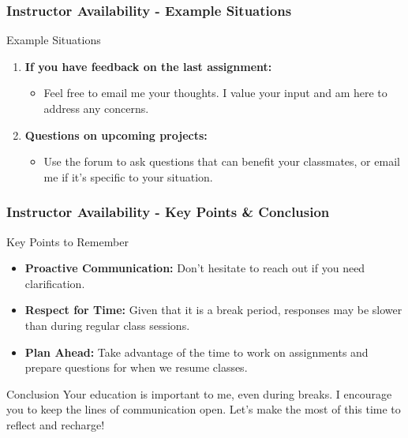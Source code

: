 \documentclass[aspectratio=169]{beamer}
\begin{document}
\begin{frame}[fragile]
    \frametitle{Instructor Availability - Example Situations}
    \begin{block}{Example Situations}
        \begin{enumerate}
            \item \textbf{If you have feedback on the last assignment:}
                \begin{itemize}
                    \item Feel free to email me your thoughts. I value your input and am here to address any concerns.
                \end{itemize}
            \item \textbf{Questions on upcoming projects:}
                \begin{itemize}
                    \item Use the forum to ask questions that can benefit your classmates, or email me if it’s specific to your situation.
                \end{itemize}
        \end{enumerate}
    \end{block}
\end{frame}

\begin{frame}[fragile]
    \frametitle{Instructor Availability - Key Points & Conclusion}
    \begin{block}{Key Points to Remember}
        \begin{itemize}
            \item \textbf{Proactive Communication:} Don’t hesitate to reach out if you need clarification. 
            \item \textbf{Respect for Time:} Given that it is a break period, responses may be slower than during regular class sessions.
            \item \textbf{Plan Ahead:} Take advantage of the time to work on assignments and prepare questions for when we resume classes.
        \end{itemize}
    \end{block}

    \begin{block}{Conclusion}
        Your education is important to me, even during breaks. I encourage you to keep the lines of communication open. Let's make the most of this time to reflect and recharge!
    \end{block}
\end{frame}
\end{document}
